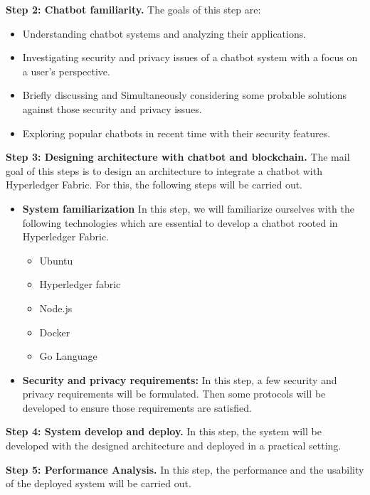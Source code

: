 \documentclass{standalone}
\begin{document}
{\textbf{Step 2: Chatbot familiarity.}} The goals of this step are:

\begin{itemize}
	\item Understanding chatbot systems and analyzing their applications.
    \item Investigating security and privacy issues of a chatbot system with a focus on a user's perspective.
    \item Briefly discussing and Simultaneously considering some probable solutions against those security and privacy issues.
    \item Exploring popular chatbots in recent time with their security features.
\end{itemize}
 
{\textbf{Step 3: Designing architecture with chatbot and blockchain.}} The mail goal of this steps is to design an architecture to integrate a chatbot with Hyperledger Fabric. For this, the following steps will be carried out.
\begin{itemize}
\item \textbf{System familiarization} In this step, we will familiarize ourselves with the following technologies which are essential to develop a chatbot rooted in Hyperledger Fabric. 
  \begin{itemize}
    \item Ubuntu
    \item Hyperledger fabric
    \item Node.js
    \item Docker
    \item Go Language
  \end{itemize}
 \item  \textbf{Security and privacy requirements:} In this step, a few security and privacy requirements will be formulated. Then some protocols will be developed to ensure those requirements are satisfied.
\end{itemize}

{\textbf{Step 4: System develop and deploy.}} In this step, the system will be developed with the designed architecture and deployed in a practical setting. 

{\textbf{Step 5: Performance Analysis.}} In this step, the performance and the usability of the deployed system will be carried out.
\end{document}
